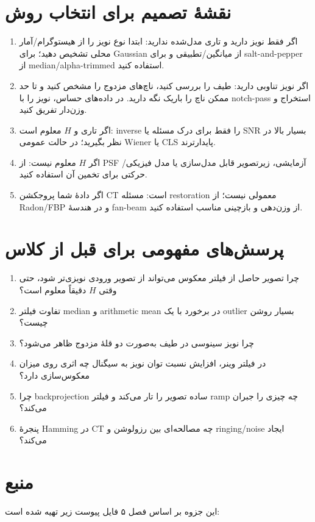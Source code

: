 \documentclass[12pt,a4paper]{report}
\begin{document}
\section*{نقشهٔ تصمیم برای انتخاب روش}
\begin{enumerate}[label=\arabic*.]
\item اگر فقط نویز دارید و تاری مدل‌شده ندارید: ابتدا نوع نویز را از هیستوگرام/آمار محلی تشخیص دهید؛ برای Gaussian از میانگین/تطبیقی و برای salt-and-pepper از median/alpha-trimmed استفاده کنید.
\item اگر نویز تناوبی دارید: طیف را بررسی کنید، ناچ‌های مزدوج را مشخص کنید و تا حد ممکن ناچ را باریک نگه دارید. در داده‌های حساس، نویز را با notch-pass استخراج و وزن‌دار تفریق کنید.
\item اگر تاری و \(H\) معلوم است: inverse را فقط برای درک مسئله یا SNR بسیار بالا در نظر بگیرید؛ در حالت عمومی Wiener یا CLS پایدارترند.
\item اگر \(H\) معلوم نیست: از PSF آزمایشی، زیرتصویر قابل مدل‌سازی یا مدل فیزیکی/حرکتی برای تخمین آن استفاده کنید.
\item اگر دادهٔ شما پروجکشن CT است: مسئله restoration معمولی نیست؛ از Radon/FBP و در هندسهٔ fan-beam از وزن‌دهی و بازچینی مناسب استفاده کنید.
\end{enumerate}

\section*{پرسش‌های مفهومی برای قبل از کلاس}
\begin{enumerate}[label=\arabic*.]
\item چرا تصویر حاصل از فیلتر معکوس می‌تواند از تصویر ورودی نویزی‌تر شود، حتی وقتی \(H\) دقیقاً معلوم است؟
\item تفاوت فیلتر median و arithmetic mean در برخورد با یک outlier بسیار روشن چیست؟
\item چرا نویز سینوسی در طیف به‌صورت دو قلهٔ مزدوج ظاهر می‌شود؟
\item در فیلتر وینر، افزایش نسبت توان نویز به سیگنال چه اثری روی میزان معکوس‌سازی دارد؟
\item چرا backprojection ساده تصویر را تار می‌کند و فیلتر ramp چه چیزی را جبران می‌کند؟
\item پنجرهٔ Hamming در CT چه مصالحه‌ای بین رزولوشن و ringing/noise ایجاد می‌کند؟
\end{enumerate}

\section*{منبع}
این جزوه بر اساس فصل ۵ فایل پیوست زیر تهیه شده است: 
\end{document}
